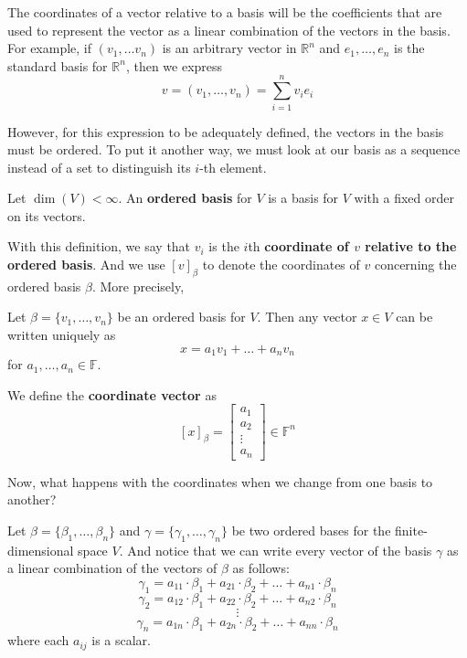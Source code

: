 The coordinates of a vector relative to a basis will be the coefficients that are used to represent the vector as a linear combination of the vectors in the basis. For example, if $(v_1, \ldots v_n)$ is an arbitrary vector in $\mathbb{R}^n$ and $e_1, \ldots, e_n$ is the standard basis for $\mathbb{R}^n$, then we express
\[
	v = (v_1, \ldots, v_n) = \sum_{i=1}^n v_i e_i
\]

However, for this expression to be adequately defined, the vectors in the basis must be ordered. To put it another way, we must look at our basis as a sequence instead of a set to distinguish its $i$-th element.

\begin{definition}
	Let $\dim(V) < \infty$. An \textbf{ordered basis} for $V$ is a basis for $V$ with a fixed order on its vectors. 
\end{definition}

With this definition, we say that $v_i$ is the $i$th \textbf{coordinate of $v$ relative to the ordered basis}. And we use $[ v ]_\beta$ to denote the coordinates of $v$ concerning the ordered basis $\beta$. More precisely,

\begin{definition}[Coordinates]
	Let $\beta = \{ v_1, \ldots, v_n \}$ be an ordered basis for $V$. Then any vector $x \in V$ can be written uniquely as
	\[
		x = a_1 v_1 + \ldots + a_n v_n
	\]
	for $a_1, \ldots, a_n \in \mathbb{F}$. 

	We define the \textbf{coordinate vector} as 
	\[
		[x]_\beta = \left[ \begin{matrix}
			a_1 \\
			a_2 \\
			\vdots \\
			a_n
			\end{matrix}\right] \in \mathbb{F}^n
	\]
\end{definition}

Now, what happens with the coordinates when we change from one basis to another?

Let $\beta = \{ \beta_1, \ldots, \beta_n \}$ and $\gamma = \{ \gamma_1, \ldots, \gamma_n \}$ be two ordered bases for the finite-dimensional space $V$. And notice that we can write every vector of the basis $\gamma$ as a linear combination of the vectors of $\beta$ as follows:
\[ \gamma_1 = a_{11}\cdot \beta_1 + a_{21}\cdot \beta_2 + \ldots + a_{n1}\cdot \beta_n \]
\[ \gamma_2 = a_{12}\cdot \beta_1 + a_{22}\cdot \beta_2 + \ldots + a_{n2}\cdot \beta_n \]
\[ \vdots \]
\[ \gamma_n = a_{1n}\cdot \beta_1 + a_{2n}\cdot \beta_2 + \ldots + a_{nn}\cdot \beta_n \]
where each $a_{ij}$ is a scalar.

